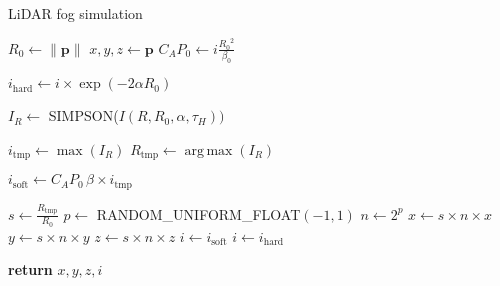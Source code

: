 \documentclass[10pt,twocolumn,letterpaper]{article}
\DeclareMathOperator*{\argmax}{arg\,max}
\begin{document}
\begin{algorithm}
  \caption{LiDAR fog simulation}\label{algorithm}
  \begin{algorithmic}[1]
      \State $R_0 \gets \|\mathbf{p}\|$
      \State $x, y, z \gets \mathbf{p}$                                              \scriptsize {} \normalsize
      \State $C_A P_0 \gets i\frac{{R_0}^2}{\beta_0}$                                   \scriptsize {} \normalsize
      
      \State $i_{\text{hard}} \gets i \times \exp(-2\alpha{}R_0)$                       \scriptsize {} \normalsize
      
                                                       \scriptsize {} \normalsize
        \State $I_R \gets$ \scriptsize SIMPSON\normalsize($I(R, R_0,\alpha,\tau_H))$    \scriptsize {} \normalsize
      \EndFor
      
      \State $i_{\text{tmp}} \gets \max(I_R)$
      \State $R_{\text{tmp}} \gets \argmax(I_R)$
      
      \State $i_{\text{soft}} \gets C_A P_0 \,\beta \times i_{\text{tmp}}$              \scriptsize {} \normalsize
      
        \State $s \gets \frac{R_{\text{tmp}}}{R_0}$                                     \scriptsize {} \normalsize
        \State $p \gets$ \scriptsize RANDOM\_UNIFORM\_FLOAT\normalsize$(-1, 1)$                    
        \State $n \gets 2^p$                                                            \scriptsize {} \normalsize
        \State $x \gets s \times n \times x$
        \State $y \gets s \times n \times y$
        \State $z \gets s \times n \times z$
        \State $i \gets i_{\text{soft}}$
      \Else                                                                             \scriptsize {} \normalsize
        \State $i \gets i_{\text{hard}}$                                                \scriptsize {} \normalsize
      \EndIf
      
      \State \textbf{return} $x, y, z, i$                                               \EndProcedure
  \end{algorithmic}
\end{algorithm}
\end{document}
